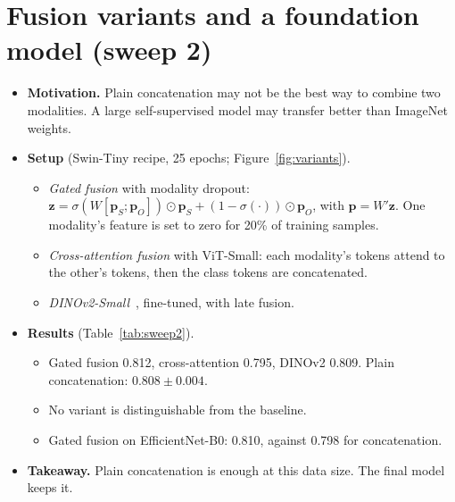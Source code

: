 \documentclass[11pt]{article}
\begin{document}
\section{Fusion variants and a foundation model (sweep 2)}\label{app:fusion}
\begin{itemize}
\item \textbf{Motivation.} Plain concatenation may not be the best way to combine two modalities. A large self-supervised model may transfer better than ImageNet weights.
\item \textbf{Setup} (Swin-Tiny recipe, 25 epochs; Figure~\ref{fig:variants}).
  \begin{itemize}
  \item \emph{Gated fusion} with modality dropout: $\mathbf{z}=\sigma(W[\mathbf{p}_S;\mathbf{p}_O])\odot \mathbf{p}_S+(1-\sigma(\cdot))\odot \mathbf{p}_O$, with $\mathbf{p}=W'\mathbf{z}$. One modality's feature is set to zero for 20\% of training samples.
  \item \emph{Cross-attention fusion} with ViT-Small: each modality's tokens attend to the other's tokens, then the class tokens are concatenated.
  \item \emph{DINOv2-Small}~\cite{dinov2}, fine-tuned, with late fusion.
  \end{itemize}
\item \textbf{Results} (Table~\ref{tab:sweep2}).
  \begin{itemize}
  \item Gated fusion 0.812, cross-attention 0.795, DINOv2 0.809. Plain concatenation: $0.808\pm0.004$.
  \item No variant is distinguishable from the baseline.
  \item Gated fusion on EfficientNet-B0: 0.810, against 0.798 for concatenation.
  \end{itemize}
\item \textbf{Takeaway.} Plain concatenation is enough at this data size. The final model keeps it.
\end{itemize}
\end{document}
